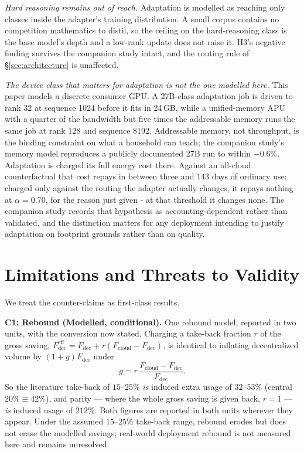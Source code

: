 \documentclass[conference]{IEEEtran}
\begin{document}
\emph{Hard reasoning remains out of reach.} Adaptation is modelled as reaching
only classes inside the adapter's training distribution. A small corpus contains
no competition mathematics to distil, so the ceiling on
the hard-reasoning class is the base model's depth and a low-rank update does not
raise it. H3's negative finding survives the companion study intact, and the
routing rule of \S\ref{sec:architecture} is unaffected.

\emph{The device class that matters for adaptation is not the one modelled
here.} This paper models a discrete consumer GPU. A 27B-class adaptation job is
driven to rank 32 at sequence 1024 before it fits in 24\,GB, while a
unified-memory APU with a quarter of the bandwidth but five times the
addressable memory runs the same job at rank 128 and sequence 8192. Addressable
memory, not throughput, is the binding constraint on what a household can teach;
the companion study's memory model reproduces a publicly documented 27B run to within
$-0.6\%$. Adaptation is charged its full energy cost there. Against an
all-cloud counterfactual that cost repays in between three and $143$ days of
ordinary use; charged only against the routing the adapter actually changes, it
repays nothing at $\alpha = 0.70$, for the reason just given - at that threshold
it changes none. The companion study records that hypothesis as
accounting-dependent rather than validated, and the distinction matters for any
deployment intending to justify adaptation on footprint grounds rather than on
quality.

\section{Limitations and Threats to Validity}
\label{sec:threats}
We treat the counter-claims as first-class results.

\textbf{C1: Rebound (Modelled, conditional).} One rebound model, reported in two
units, with the conversion now stated. Charging a take-back fraction $r$ of the
gross saving, $F^{\text{eff}}_{\text{dec}} = F_{\text{dec}} + r(F_{\text{cloud}}
- F_{\text{dec}})$, is identical to inflating decentralized volume by
$(1+g)F_{\text{dec}}$ under
\begin{equation}
g = r\,\frac{F_{\text{cloud}} - F_{\text{dec}}}{F_{\text{dec}}}.
\label{eq:rebound-units}
\end{equation}
So the literature take-back of $15$--$25\%$ \cite{luccioni2025} \emph{is}
induced extra usage of $32$--$53\%$ (central $20\% \equiv 42\%$), and parity ---
where the whole gross saving is given back, $r=1$ --- \emph{is} induced usage of
$212\%$. Both figures are reported in both units wherever they appear. Under
the assumed $15$--$25\%$ take-back range, rebound erodes but does not erase the
modelled savings; real-world deployment rebound is not measured here and remains
unresolved.
\end{document}
